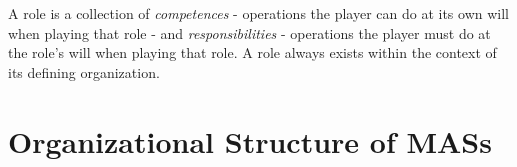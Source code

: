 A role is a collection of \textit{competences} - operations the player can do at its own will when playing that role - and \textit{responsibilities} - operations the player must do at the role's will when playing that role.
A role always exists within the context of its defining organization.



\section{Organizational Structure of MASs}
